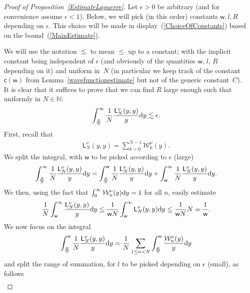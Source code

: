 \documentclass[pdftex]{sigma}
\numberwithin{equation}{section}
\begin{document}
\begin{proof}[Proof of Proposition~\ref{EstimateLaguerre}]
Let $\epsilon>0$ be arbitrary (and for convenience assume $\epsilon<1$). Below, we will pick (in this order) constants $\mathsf{w}, l, R$ depending on $\epsilon$. This choice will be made in display~(\ref{ChoiceOfConstants}) based on the bound~(\ref{MainEstimate}).

We will use the notation $\lesssim$ to mean $\le$ up to a constant; with the implicit constant being independent of $\epsilon$ (and obviously of the quantities $\mathsf{w}$, $l$, $R$ depending on it) and uniform in~$N$ (in particular we keep track of the constant $\mathsf{c}(\mathsf{w})$ from Lemma~\ref{wavefunctionestimate} but not of the generic constant~$C$). It is clear that it suffices to prove that we can find $R$ large enough such that uniformly in $N \in \mathbb{N}$:
\begin{gather*}
\int_{\frac{R}{N}}^{\infty}\frac{1}{N}\frac{\mathsf{L}_N^{\nu}(y,y)}{y}{\rm d}y \lesssim \epsilon.
\end{gather*}
First, recall that
\begin{gather*}
\mathsf{L}_N^{\nu}(y,y)=\sum_{k=0}^{N-1}\mathcal{W}_k^\nu(y).
\end{gather*}
We split the integral, with $\mathsf{w}$ to be picked according to $\epsilon$ (large)
\begin{gather*}
\int_{\frac{R}{N}}^{\infty}\frac{1}{N}\frac{\mathsf{L}_N^{\nu}(y,y)}{y}{\rm d} y= \int_{\frac{R}{N}}^{\mathsf{w}}\frac{1}{N}\frac{\mathsf{L}_N^{\nu}(y,y)}{y}{\rm d}y +\int_{\mathsf{w}}^{\infty}\frac{1}{N}\frac{\mathsf{L}_N^{\nu}(y,y)}{y}{\rm d}y.
\end{gather*}
We then, using the fact that $\int_{0}^{\infty}\mathcal{W}_n^{\nu}(y){\rm d}y=1$ for all $n$, easily estimate
\begin{gather*}
\frac{1}{N}\int_{\mathsf{w}}^{\infty}\frac{\mathsf{L}_N^{\nu}(y,y)}{y}{\rm d}y\le\frac{1}{\mathsf{w}N} \int_{\mathsf{w}}^{\infty}\mathsf{L}_N^{\nu}(y,y){\rm d}y \le \frac{1}{\mathsf{w}N}N=\frac{1}{\mathsf{w}}.
\end{gather*}
We now focus on the integral
\begin{gather*}
\int_{\frac{R}{N}}^{\mathsf{w}}\frac{1}{N}\frac{\mathsf{L}_N^{\nu}(y,y)}{y}{\rm d}y =\frac{1}{N}\sum_{1 \le n < N}^{} \int_{\frac{R}{N}}^{\mathsf{w}}\frac{\mathcal{W}_n^{\nu}(y)}{y}{\rm d}y
\end{gather*}
and split the range of summation, for $l$ to be picked depending on $\epsilon$ (small), as follows
\begin{gather*}

\end{gather*}
\end{proof}
\end{document}
